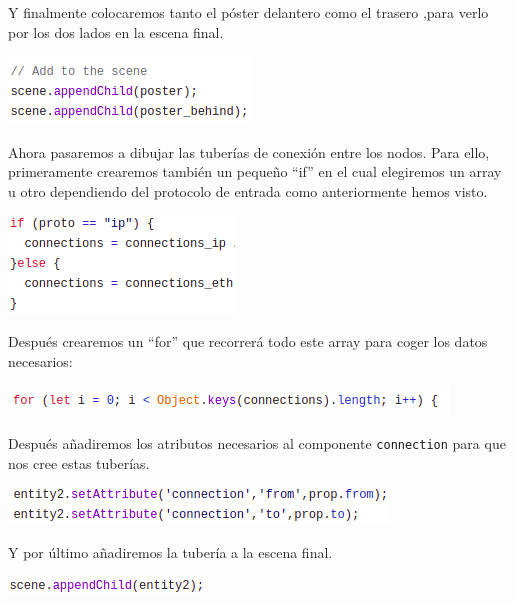 \documentclass[a4paper, 12pt]{book}
\begin{document}
Y finalmente colocaremos tanto el póster delantero como el trasero ,para verlo por los dos lados en la escena final.

\begin{center}
    \includegraphics[scale=0.7]{img/escenapost_comp_netsim.png}
\end{center}

Ahora pasaremos a dibujar las tuberías de conexión entre los nodos. Para ello, primeramente crearemos también un pequeño “if” en el cual elegiremos un array u otro dependiendo del protocolo de entrada como anteriormente hemos visto.

\begin{center}
    \includegraphics[scale=0.7]{img/ifINIconn_comp_netsim.png}
\end{center}

Después crearemos un “for” que recorrerá todo este array para coger los datos necesarios:

\begin{center}
    \includegraphics[scale=0.7]{img/forConne_comp_netsim.png}
\end{center}

Después añadiremos los atributos necesarios al componente \texttt{connection} para que nos cree estas tuberías.

\begin{center}
    \includegraphics[scale=0.7]{img/atribConn_comp_netsim.png}
\end{center}

Y por último añadiremos la tubería a la escena final.

\begin{center}
    \includegraphics[scale=0.7]{img/escenaConn_comp_netsim.png}
\end{center}
\end{document}
